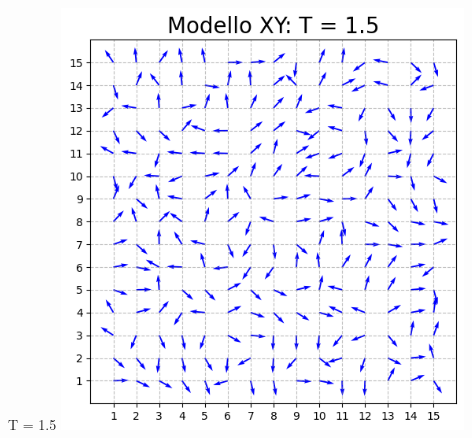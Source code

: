 \begin{frame}
\begin{columns}
\begin{column}{0.5\textwidth}
\begin{block}{T = 1.5}
                \centering
                \includegraphics[width=0.8\textwidth]{Immagini/backupXY/conf_T1.5.png}

            \end{block}
        \end{column}
    \end{columns}

\end{frame}



